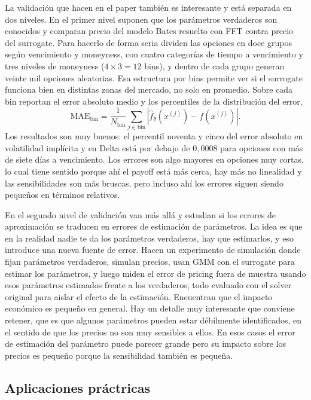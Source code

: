 \documentclass[11pt,a4paper]{article}
\begin{document}
La validación que hacen en el paper también es interesante y está separada en dos niveles. En el primer nivel suponen que los parámetros verdaderos son conocidos y comparan precio del modelo Bates resuelto con FFT contra precio del surrogate. Para hacerlo de forma seria dividen las opciones en doce grupos según vencimiento y moneyness, con cuatro categorías de tiempo a vencimiento y tres niveles de moneyness ($4 \times 3 = 12$ bins), y dentro de cada grupo generan veinte mil opciones aleatorias. Esa estructura por bins permite ver si el surrogate funciona bien en distintas zonas del mercado, no solo en promedio. Sobre cada bin reportan el error absoluto medio y los percentiles de la distribución del error,
\begin{equation}
\mathrm{MAE}_{\mathrm{bin}} = \frac{1}{N_{\mathrm{bin}}} \sum_{j \in \mathrm{bin}} \left| \hat{f}_\theta(x^{(j)}) - f(x^{(j)}) \right|.
\end{equation}
Los resultados son muy buenos: el percentil noventa y cinco del error absoluto en volatilidad implícita y en Delta está por debajo de $0{,}0008$ para opciones con más de siete días a vencimiento. Los errores son algo mayores en opciones muy cortas, lo cual tiene sentido porque ahí el payoff está más cerca, hay más no linealidad y las sensibilidades son más bruscas, pero incluso ahí los errores siguen siendo pequeños en términos relativos.

En el segundo nivel de validación van más allá y estudian si los errores de aproximación se traducen en errores de estimación de parámetros. La idea es que en la realidad nadie te da los parámetros verdaderos, hay que estimarlos, y eso introduce una nueva fuente de error. Hacen un experimento de simulación donde fijan parámetros verdaderos, simulan precios, usan GMM con el surrogate para estimar los parámetros, y luego miden el error de pricing fuera de muestra usando esos parámetros estimados frente a los verdaderos, todo evaluado con el solver original para aislar el efecto de la estimación. Encuentran que el impacto económico es pequeño en general. Hay un detalle muy interesante que conviene retener, que es que algunos parámetros pueden estar débilmente identificados, en el sentido de que los precios no son muy sensibles a ellos. En esos casos el error de estimación del parámetro puede parecer grande pero su impacto sobre los precios es pequeño porque la sensibilidad también es pequeña.

\subsection{Aplicaciones práctricas}
\end{document}
